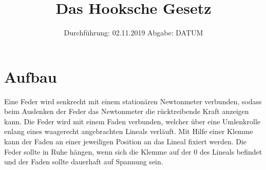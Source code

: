 

\subject{803}
\title{Das Hooksche Gesetz}
\date{%
  Durchführung: 02.11.2019
  \hspace{3em}
  Abgabe: DATUM
}



\maketitle
\thispagestyle{empty}
\tableofcontents
\newpage



    \section{Aufbau}
    \label{sec:Aufbau}

    Eine Feder wird senkrecht mit einem stationären Newtonmeter verbunden, sodass beim Auslenken
    der Feder das Newtonmeter die rücktreibende Kraft anzeigen kann. Die Feder wird mit einem 
    Faden verbunden, welcher über eine Umlenkrolle enlang eines waagerecht angebrachten Lineals verläuft.
    Mit Hilfe einer Klemme kann der Faden an einer jeweiligen Position an das Lineal fixiert werden.
    Die Feder sollte in Ruhe hängen, wenn sich die Klemme auf der 0 des Lineals befindet und der Faden sollte 
    dauerhaft auf Spannung sein.





\printbibliography{}


